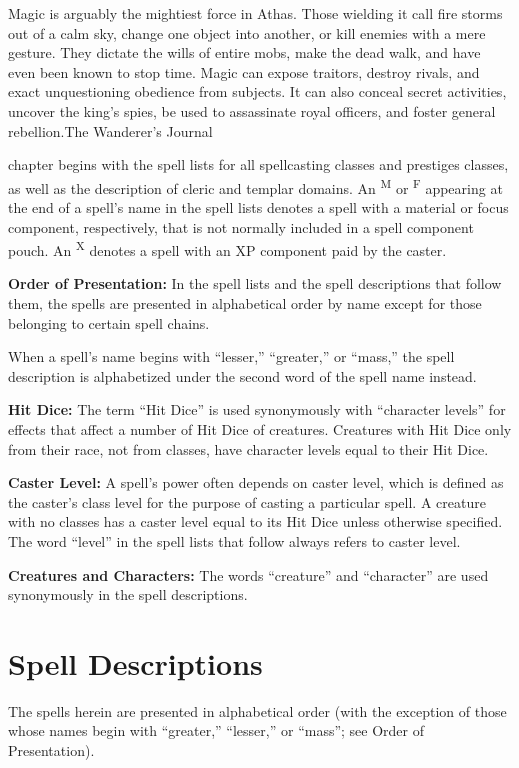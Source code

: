 {Magic is arguably the mightiest force in Athas. Those wielding it call fire storms out of a calm sky, change one object into another, or kill enemies with a mere gesture. They dictate the wills of entire mobs, make the dead walk, and have even been known to stop time. Magic can expose traitors, destroy rivals, and exact unquestioning obedience from subjects. It can also conceal secret activities, uncover the king's spies, be used to assassinate royal officers, and foster general rebellion.}{The Wanderer's Journal}

 chapter begins with the spell lists for all spellcasting classes and prestiges classes, as well as the description of cleric and templar domains. An \textsuperscript{M} or \textsuperscript{F} appearing at the end of a spell's name in the spell lists denotes a spell with a material or focus component, respectively, that is not normally included in a spell component pouch. An \textsuperscript{X} denotes a spell with an XP component paid by the caster.

\textbf{Order of Presentation:} In the spell lists and the spell descriptions that follow them, the spells are presented in alphabetical order by name except for those belonging to certain spell chains.

When a spell's name begins with ``lesser,'' ``greater,'' or ``mass,'' the spell description is alphabetized under the second word of the spell name instead.

\textbf{Hit Dice:} The term ``Hit Dice'' is used synonymously with ``character levels'' for effects that affect a number of Hit Dice of creatures. Creatures with Hit Dice only from their race, not from classes, have character levels equal to their Hit Dice.

\textbf{Caster Level:} A spell's power often depends on caster level, which is defined as the caster's class level for the purpose of casting a particular spell. A creature with no classes has a caster level equal to its Hit Dice unless otherwise specified. The word ``level'' in the spell lists that follow always refers to caster level.

\textbf{Creatures and Characters:} The words ``creature'' and ``character'' are used synonymously in the spell descriptions.





% 

\vskip3cm




\clearpage
\section{Spell Descriptions}
The spells herein are presented in alphabetical order (with the exception of those whose names begin with ``greater,'' ``lesser,'' or ``mass''; see Order of Presentation).


